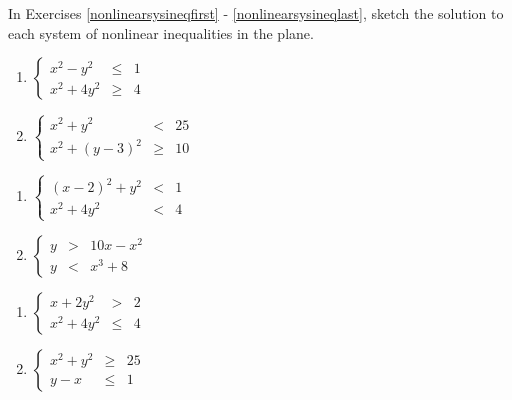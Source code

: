 \label{ExercisesforNonLinearInequalities}

In Exercises \ref{nonlinearsysineqfirst} - \ref{nonlinearsysineqlast}, sketch the solution to each system of nonlinear inequalities in the plane.


\begin{multicols}{2}
\begin{enumerate}


\item $\left\{\begin{array}{rcr}  x^{2} - y^{2} & \leq & 1 \\ x^{2} + 4y^{2} & \geq & 4  \end{array} \right.$ \label{nonlinearsysineqfirst}
\item $\left\{\begin{array}{rcr}  x^{2} + y^{2} & < & 25 \\ x^{2} + (y - 3)^{2} & \geq & 10  \end{array} \right.$

\setcounter{HW}{\value{enumi}}
\end{enumerate}
\end{multicols}

\begin{multicols}{2}
\begin{enumerate}
\setcounter{enumi}{\value{HW}}

\item $\left\{\begin{array}{rcr}  (x - 2)^{2} + y^{2} & < & 1 \\ x^{2} + 4y^{2} & < & 4  \end{array} \right.$
\item $\left\{\begin{array}{rcr}  y & > & 10x - x^{2} \\ y & < & x^{3} + 8  \end{array} \right.$

\setcounter{HW}{\value{enumi}}
\end{enumerate}
\end{multicols}

\begin{multicols}{2}
\begin{enumerate}
\setcounter{enumi}{\value{HW}}

\item $\left\{\begin{array}{rcr}  x + 2y^{2} & > & 2 \\ x^{2} + 4y^{2} & \leq & 4  \end{array} \right.$
\item $\left\{\begin{array}{rcr}  x^{2} + y^{2} & \geq & 25 \\ y - x & \leq & 1  \end{array} \right.$ \label{nonlinearsysineqlast}

\setcounter{HW}{\value{enumi}}
\end{enumerate}
\end{multicols}


